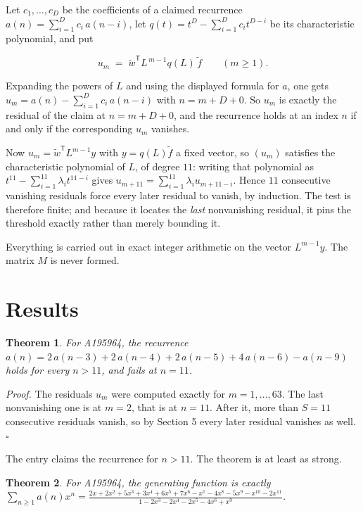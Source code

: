 \documentclass[11pt]{article}
\newtheorem{theorem}{Theorem}
\theoremstyle{definition}
\begin{document}
Let $c_1,\dots,c_D$ be the coefficients of a claimed recurrence $a(n) = \sum_{i=1}^{D} c_i\,a(n-i)$, let $q(t) = t^{D} - \sum_{i=1}^{D} c_i t^{D-i}$ be its characteristic polynomial, and put

\[u_m \;=\; \tilde w^{\mathsf T} L^{\,m-1} q(L)\,\tilde f \qquad (m \ge 1).\]

Expanding the powers of $L$ and using the displayed formula for $a$, one gets $u_m = a(n) - \sum_{i=1}^{D} c_i\,a(n-i)$ with $n = m + D + 0$. So $u_m$ is exactly the residual of the claim at $n = m + D + 0$, and the recurrence holds at an index $n$ if and only if the corresponding $u_m$ vanishes.

Now $u_m = \tilde w^{\mathsf T} L^{m-1} y$ with $y = q(L)\tilde f$ a fixed vector, so $(u_m)$ satisfies the characteristic polynomial of $L$, of degree $11$: writing that polynomial as $t^{11} - \sum_{i=1}^{11} \lambda_i t^{11-i}$ gives $u_{m+11} = \sum_{i=1}^{11} \lambda_i u_{m+11-i}$. Hence $11$ consecutive vanishing residuals force every later residual to vanish, by induction. The test is therefore finite; and because it locates the {\itshape last} nonvanishing residual, it pins the threshold exactly rather than merely bounding it.

Everything is carried out in exact integer arithmetic on the vector $L^{m-1}y$. The matrix $M$ is never formed.

\section{Results}

\begin{theorem} For A195964, the recurrence $a(n) = 2\,a(n-3) + 2\,a(n-4) + 2\,a(n-5) + 4\,a(n-6) - a(n-9)$ holds for every $n > 11$, and fails at $n = 11$.\end{theorem}

{\itshape Proof.} The residuals $u_m$ were computed exactly for $m = 1,\dots,63$. The last nonvanishing one is at $m = 2$, that is at $n = 11$. After it, more than $S = 11$ consecutive residuals vanish, so by Section 5 every later residual vanishes as well. $\square$

The entry claims the recurrence for $n > 11$. The theorem is at least as strong.

\begin{theorem} For A195964, the generating function is exactly $\sum_{n\ge 1} a(n)x^n = \frac{2x + 2x^{2} + 5x^{3} + 3x^{4} + 6x^{5} + 7x^{6} - x^{7} - 4x^{8} - 5x^{9} - x^{10} - 2x^{11}}{1 - 2x^{3} - 2x^{4} - 2x^{5} - 4x^{6} + x^{9}}$.\end{theorem}
\end{document}
